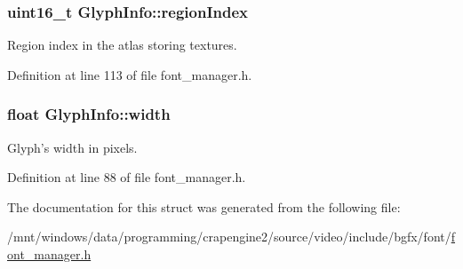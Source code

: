 \hypertarget{struct_glyph_info_a82c347997a66291d8d4aaa7db764d4e2}{
\subsubsection[{region\+Index}]{\setlength{\rightskip}{0pt plus 5cm}uint16\+\_\+t Glyph\+Info\+::region\+Index}}\label{struct_glyph_info_a82c347997a66291d8d4aaa7db764d4e2}


Region index in the atlas storing textures. 



Definition at line 113 of file font\+\_\+manager.\+h.

\hypertarget{struct_glyph_info_af8f1393ec498cdabefbaf08f77b62cbd}{
\subsubsection[{width}]{\setlength{\rightskip}{0pt plus 5cm}float Glyph\+Info\+::width}}\label{struct_glyph_info_af8f1393ec498cdabefbaf08f77b62cbd}


Glyph's width in pixels. 



Definition at line 88 of file font\+\_\+manager.\+h.



The documentation for this struct was generated from the following file\+:\begin{DoxyCompactItemize}
\item 
/mnt/windows/data/programming/crapengine2/source/video/include/bgfx/font/\hyperlink{font__manager_8h}{font\+\_\+manager.\+h}\end{DoxyCompactItemize}

